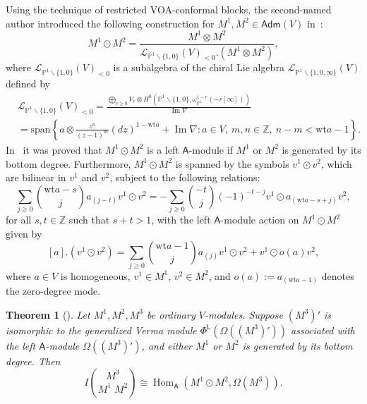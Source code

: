 \documentclass[12pt,a4paper,reqno]{amsart}
\numberwithin{equation}{section}
\newtheorem{theorem}{Theorem}[section]
\theoremstyle{definition}
\newcommand{\Hom}{\operatorname{Hom}}
\newcommand{\im}{\operatorname{Im}}
\newcommand{\Z}{\mathbb{Z}}
\renewcommand{\P}{\mathbb{P}}
\newcommand{\fusion}[3]{{\binom{#3}{#1\;#2}}}
\def\Adm{\mathsf{Adm}}
\def\L{\mathsf{L}}
\def\Om{\Omega}
\def\spn{\mathrm{span}}
\def\bs{\backslash}
\def\om{\omega}
\def\o{\otimes}
\def\wt{\mathrm{wt}}
\def\A{\mathsf{A}}
\begin{document}
Using the technique of restricted VOA-conformal blocks, the second-named author introduced the following construction for $M^1,M^2\in \Adm(V)$ in~\cite{L26}:
\begin{equation}\label{eq:M1odotM2}
M^1\odot M^2=\frac{M^1\o M^2}{\mathcal{L}_{\P^1\bs\{1,0\}}(V)_{<0}. (M^1\o M^2)},
\end{equation}
where $\mathcal{L}_{\P^1\bs\{1,0\}}(V)_{<0}$ is a subalgebra of the chiral Lie algebra $\mathcal{L}_{\P^1\bs\{1,0,\infty\}}(V)$ defined by
\begin{align*}
&\mathcal{L}_{\P^1\bs\{1,0\}}(V)_{<0}=\frac{\bigoplus_{r\geq 0} V_r\otimes H^0(\P^1\bs \{1,0\}, \om_{\P^1}^{1-r}(-r [\infty]))}{\im\nabla }\\
&=\spn\left\{a\o \frac{z^n}{(z-1)^m} (dz)^{1-\wt a}+\im\nabla: a\in V,\ m,n\in\Z,\  n-m<\wt a-1\right\}.
\end{align*}
In~\cite[Theorem 4.8]{L26} it was proved that $M^1\odot M^2$ is a left $\A$-module if $M^1$ or $M^2$ is generated by its bottom degree.
Furthermore,
$M^1\odot M^2$ is spanned by the symbols $v^1\odot v^2$, which are bilinear in $v^1$ and $v^2$, subject to the following relations:
 \begin{equation}\label{eq:uniformrel}
\sum_{j\geq 0} \binom{\wt a-s}{j}  a_{(j-t)}v^1\odot v^2
	=-\sum_{j\geq 0}\binom{-t}{j} (-1)^{-t-j} v^1\odot a_{(\wt a-s+j)}v^2,
\end{equation}
for all $s,t\in \Z$ such that $s+t>1$,
with the left $\A$-module action on $M^1\odot M^2$ given by
\begin{equation}\label{eq:Aaction}
[a]. (v^1\odot v^2)=\sum_{j\geq 0} \binom{\wt a-1}{j} a_{(j)}v^1\odot v^2+ v^1\odot o(a)v^2,
\end{equation}
where $a\in V$ is homogeneous, $v^1\in M^1$, $v^2\in M^2$, and $o(a):=a_{(\wt a-1)}$ denotes the zero-degree mode. 

\begin{theorem}[{\cite[Theorem 6.2]{L26}}]\label{thm:odotfusion}
Let $M^1,M^2,M^3$ be ordinary $V$-modules. Suppose  $(M^3)'$ is isomorphic to the generalized Verma module $\Phi^\L(\Om((M^3)') )$ associated with the left $\A$-module $\Om((M^3)')$, and either $M^1$ or $M^2$ is generated by its bottom degree. Then 
\[
I\fusion{M^1}{M^2}{M^3}\cong \Hom_\A(M^1\odot M^2,\Om(M^3)).
\]
\end{theorem}
\end{document}
